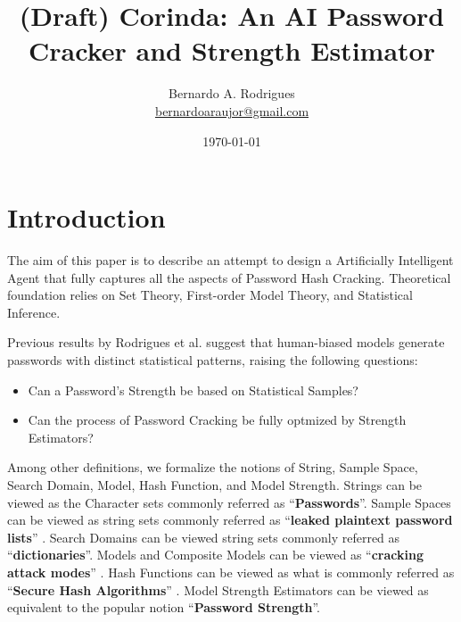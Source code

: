 \documentclass{article}
\title{(Draft) Corinda: An AI Password Cracker and Strength Estimator}
\date{\today}
\author{Bernardo A. Rodrigues \\ \href{mailto:bernardoaraujor@gmail.com}{bernardoaraujor@gmail.com} }
\begin{document}
 
\begin{titlepage}
\maketitle
\end{titlepage}

\printglossaries
\clearpage

\section{Introduction}

The aim of this paper is to describe an attempt to design a Artificially Intelligent Agent that fully captures all the aspects of Password Hash Cracking. Theoretical foundation relies on Set Theory,
First-order Model Theory, and Statistical Inference.

Previous results by Rodrigues et al. \cite{?} suggest that human-biased models generate passwords with distinct statistical patterns, raising the following questions:
\begin{itemize}
    \item  Can a Password's Strength be based on Statistical Samples?
    \item  Can the process of Password Cracking be fully optmized by Strength Estimators?
    
\end{itemize}

Among other definitions, we formalize the notions of String, Sample Space, Search Domain, Model, Hash Function, and Model Strength. Strings can be viewed as the Character sets commonly referred as ``\textbf{Passwords}''. Sample Spaces can be viewed as string sets commonly referred as ``\textbf{leaked plaintext password lists}'' \cite{?}. Search Domains can be viewed string sets commonly referred as ``\textbf{dictionaries}''. Models and Composite Models can be viewed as ``\textbf{cracking attack modes}'' {\cite{?}}. Hash Functions can be viewed as what is commonly referred as ``\textbf{Secure Hash Algorithms}'' \cite{?}. Model Strength Estimators can be viewed as equivalent to the popular notion ``\textbf{Password Strength}''.
\end{document}
